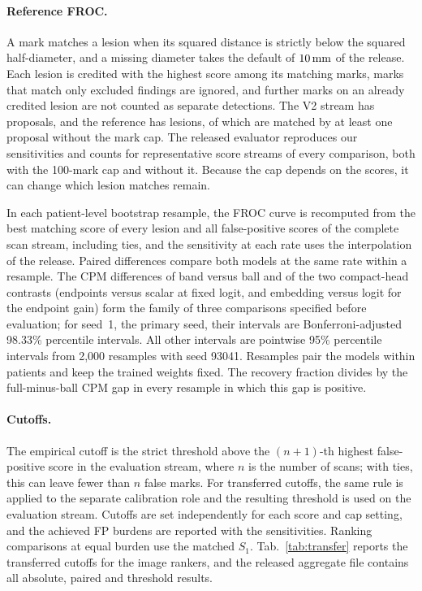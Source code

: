 \paragraph{Reference FROC.}
A mark matches a lesion when its squared distance is strictly below the squared half-diameter, and a missing diameter takes the default of $10\,\mathrm{mm}$ of the release. Each lesion is credited with the highest score among its matching marks, marks that match only excluded findings are ignored, and further marks on an already credited lesion are not counted as separate detections. The V2 stream has \EvalMarks{} proposals, and the reference has \EvalLesions{} lesions, of which \ProposedLesions{} are matched by at least one proposal without the mark cap. The released evaluator reproduces our sensitivities and counts for representative score streams of every comparison, both with the 100-mark cap and without it. Because the cap depends on the scores, it can change which lesion matches remain.

In each patient-level bootstrap resample, the FROC curve is recomputed from the best matching score of every lesion and all false-positive scores of the complete scan stream, including ties, and the sensitivity at each rate uses the interpolation of the release. Paired differences compare both models at the same rate within a resample. The CPM differences of band versus ball and of the two compact-head contrasts (endpoints versus scalar at fixed logit, and embedding versus logit for the endpoint gain) form the family of three comparisons specified before evaluation; for seed~1, the primary seed, their intervals are Bonferroni-adjusted 98.33\% percentile intervals. All other intervals are pointwise 95\% percentile intervals from 2,000 resamples with seed 93041. Resamples pair the models within patients and keep the trained weights fixed. The recovery fraction divides by the full-minus-ball CPM gap in every resample in which this gap is positive.

\paragraph{Cutoffs.}
The empirical cutoff is the strict threshold above the $(n+1)$-th highest false-positive score in the evaluation stream, where $n$ is the number of scans; with ties, this can leave fewer than $n$ false marks. For transferred cutoffs, the same rule is applied to the separate calibration role and the resulting threshold is used on the evaluation stream. Cutoffs are set independently for each score and cap setting, and the achieved FP burdens are reported with the sensitivities. Ranking comparisons at equal burden use the matched $S_1$. Tab.~\ref{tab:transfer} reports the transferred cutoffs for the image rankers, and the released aggregate file contains all absolute, paired and threshold results.

